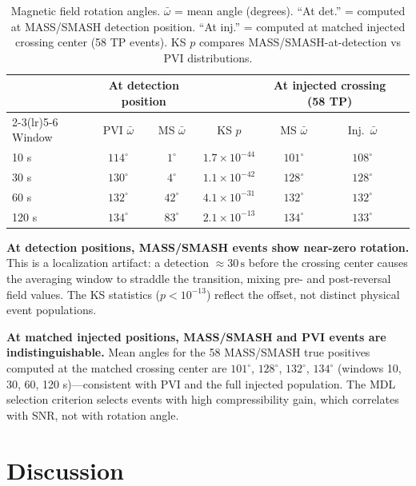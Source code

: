 \documentclass[12pt,letterpaper]{article}
\newcommand{\secunit}{\,\mathrm{s}}
\begin{document}
\begin{table}[t]
\centering
\caption{Magnetic field rotation angles.
$\bar{\omega}$ = mean angle (degrees).
``At det.'' = computed at MASS/SMASH detection position.
``At inj.'' = computed at matched injected crossing center (58 TP events).
KS $p$ compares MASS/SMASH-at-detection vs PVI distributions.}
\label{tab:angles}
\begin{tabular}{lcccccc}
\toprule
 & \multicolumn{2}{c}{At detection position} & & \multicolumn{2}{c}{At injected crossing (58 TP)} \\
\cmidrule(lr){2-3}\cmidrule(lr){5-6}
Window & PVI $\bar{\omega}$ & MS $\bar{\omega}$ & KS $p$ &
         MS $\bar{\omega}$ & Inj.\ $\bar{\omega}$ \\
\midrule
10 s  & $114^\circ$ & \phantom{0}$1^\circ$ & $1.7\times10^{-44}$ & $101^\circ$ & $108^\circ$ \\
30 s  & $130^\circ$ & \phantom{0}$4^\circ$ & $1.1\times10^{-42}$ & $128^\circ$ & $128^\circ$ \\
60 s  & $132^\circ$ & $42^\circ$ & $4.1\times10^{-31}$ & $132^\circ$ & $132^\circ$ \\
120 s & $134^\circ$ & $83^\circ$ & $2.1\times10^{-13}$ & $134^\circ$ & $133^\circ$ \\
\bottomrule
\end{tabular}
\end{table}

\textbf{At detection positions, MASS/SMASH events show near-zero rotation.}
This is a localization artifact: a detection $\approx 30\secunit$ before the
crossing center causes the averaging window to straddle the transition,
mixing pre- and post-reversal field values.
The KS statistics ($p < 10^{-13}$) reflect the offset, not distinct
physical event populations.

\textbf{At matched injected positions, MASS/SMASH and PVI events are
indistinguishable.}
Mean angles for the 58 MASS/SMASH true positives computed at the matched
crossing center are $101^\circ$, $128^\circ$, $132^\circ$, $134^\circ$
(windows 10, 30, 60, 120 s)---consistent with PVI and the full injected
population.
The MDL selection criterion selects events with high compressibility gain,
which correlates with SNR, not with rotation angle.

\section{Discussion}
\label{sec:discussion}
\end{document}
